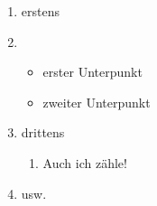 \begin{enumerate}
\item erstens
\item \begin{itemize}
\item erster Unterpunkt
\item zweiter Unterpunkt
\end{itemize}
\item drittens
\begin{enumerate}
\item Auch ich zähle!
\end{enumerate}
\item usw.
\end{enumerate}